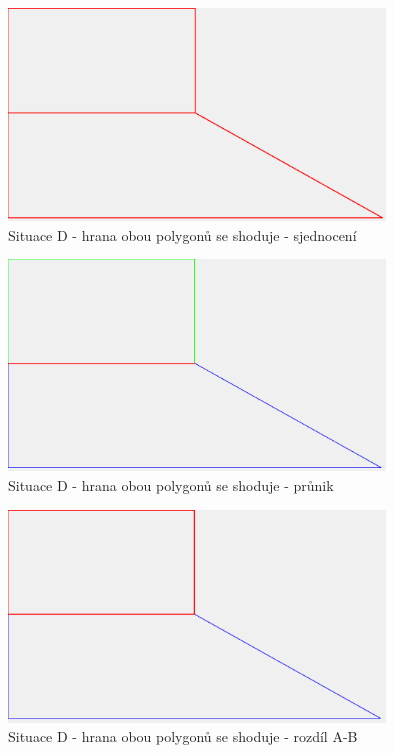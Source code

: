 \documentclass[a4paper,11pt,twoside]{article}
\begin{document}
\vspace{0.2cm}
\begin{figure}[hbt!] 
\begin{center}
\includegraphics[width=10cm]{pictures/D_union.png} 
\caption[Situace D - hrana obou polygonů se shoduje - sjednocení]{Situace D - hrana obou polygonů se shoduje - sjednocení}
\label{fig:D_union}
\end{center}
\end{figure}

\vspace{0.2cm}
\begin{figure}[hbt!] 
\begin{center}
\includegraphics[width=10cm]{pictures/D_intersect.png} 
\caption[Situace D - hrana obou polygonů se shoduje - průnik]{Situace D - hrana obou polygonů se shoduje - průnik}
\label{fig:D_intersect}
\end{center}
\end{figure}

\vspace{0.2cm}
\begin{figure}[hbt!] 
\begin{center}
\includegraphics[width=10cm]{pictures/D_diffAB.png} 
\caption[Situace D - hrana obou polygonů se shoduje - rozdíl A-B]{Situace D - hrana obou polygonů se shoduje - rozdíl A-B}
\label{fig:D_diffAB}
\end{center}
\end{figure}
\end{document}
